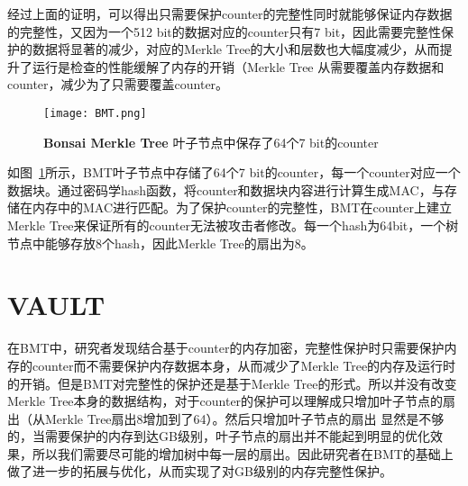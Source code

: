经过上面的证明，可以得出只需要保护counter的完整性同时就能够保证内存数据的完整性，又因为一个512 bit的数据对应的counter只有7 bit，因此需要完整性保护的数据将显著的减少，对应的Merkle Tree的大小和层数也大幅度减少，从而提升了运行是检查的性能缓解了内存的开销（Merkle Tree 从需要覆盖内存数据和counter，减少为了只需要覆盖counter。

\begin{figure}[!htp]
    \centering
    \texttt{[image: BMT.png]}
    \caption{\textbf{Bonsai Merkle Tree }叶子节点中保存了64个7 bit的counter}
   \label{fig:BMT.png}
\end{figure}
如图~\ref{fig:BMT.png}所示，BMT叶子节点中存储了64个7 bit的counter，每一个counter对应一个数据块。通过密码学hash函数，将counter和数据块内容进行计算生成MAC，与存储在内存中的MAC进行匹配。为了保护counter的完整性，BMT在counter上建立Merkle Tree来保证所有的counter无法被攻击者修改。每一个hash为64bit，一个树节点中能够存放8个hash，因此Merkle Tree的扇出为8。

\section{VAULT}
在BMT中，研究者发现结合基于counter的内存加密，完整性保护时只需要保护内存的counter而不需要保护内存数据本身，从而减少了Merkle Tree的内存及运行时的开销。但是BMT对完整性的保护还是基于Merkle Tree的形式。所以并没有改变Merkle Tree本身的数据结构，对于counter的保护可以理解成只增加叶子节点的扇出（从Merkle Tree扇出8增加到了64）。然后只增加叶子节点的扇出
显然是不够的，当需要保护的内存到达GB级别，叶子节点的扇出并不能起到明显的优化效果，所以我们需要尽可能的增加树中每一层的扇出。因此研究者在BMT的基础上做了进一步的拓展与优化，从而实现了对GB级别的内存完整性保护。

